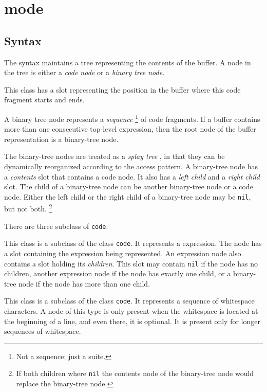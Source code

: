 \chapter{\commonlisp{} mode}
\label{chap-internals-common-lisp-mode}

\section{Syntax}

The \commonlisp{} syntax maintains a tree representing the contents of
the buffer.  A node in the tree is either a \emph{code node} or
a \emph{binary tree node}.


This class has a slot representing the position in the buffer where
this code fragment starts and ends.


A binary tree node represents a \emph{sequence}%
\footnote{Not a \commonlisp{} sequence; just a suite.}  of code
fragments.  If a buffer contains more than one consecutive top-level
expression, then the root node of the buffer representation is a
binary-tree node.

The binary-tree nodes are treated as a \emph{splay tree}
\cite{Sleator:1985:SBS:3828.3835}, in that they can be dynamically
reorganized according to the access pattern.  A binary-tree node has a
\emph{contents} slot that contains a code node.  It also has a
\emph{left child} and a \emph{right child} slot.  The child of a
binary-tree node can be another binary-tree node or a code node.
Either the left child or the right child of a binary-tree node may be
\texttt{nil}, but not both.%
\footnote{If both children where \texttt{nil} the contents node of the
  binary-tree node would replace the binary-tree node.}

There are three subclass of \texttt{code}:


This class is a subclass of the class \texttt{code}.  It represents a
\commonlisp{} expression.  The node has a slot containing the
expression being represented.  An expression node also
contains a slot holding its \emph{children}.  This slot may contain
\texttt{nil} if the node has no children, another expression node if
the node has exactly one child, or a binary-tree node if the node has
more than one child.


This class is a subclass of the class \texttt{code}.  It represents a
sequence of whitespace characters.  A node of this type is only
present when the whitespace is located at the beginning of a line, and
even there, it is optional.  It is present only for longer sequences
of whitespace.

